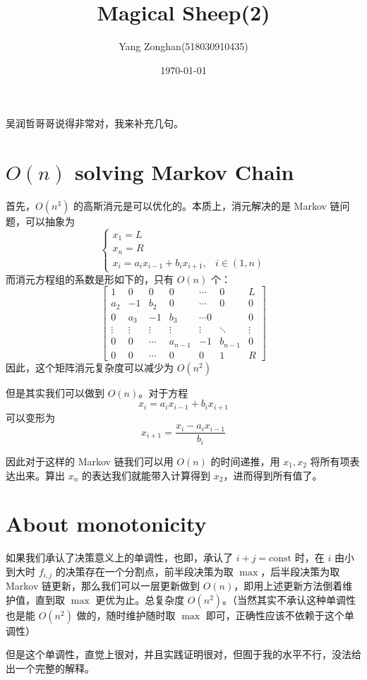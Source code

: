 \documentclass[11pt,a4paper,oneside]{article}
\begin{document}
\title{\textbf{Magical Sheep(2)}}
\author{Yang Zonghan(518030910435)}
\date{\today}
\setlength{\parindent}{2em}

吴润哲哥哥说得非常对，我来补充几句。

\section{$O(n)$ solving Markov Chain}
首先，$O(n ^ 3)$ 的高斯消元是可以优化的。本质上，消元解决的是 Markov 链问题，可以抽象为 $$
\begin{cases}
    x_1 = L \\
    x_n = R \\
    x_i = a_i x_{i- 1} + b_i x_{i + 1}, &i \in (1, n)
\end{cases}
$$ 而消元方程组的系数是形如下的，只有 $O(n)$ 个：
$$\begin{bmatrix}
     1 & 0 & 0 & 0 &\cdots & 0 & L\\
     a_2 & -1 & b_2 & 0 & \cdots & 0 & 0 \\
     0 & a_3 & -1 & b_3 &\cdots 0& & 0 \\
     \vdots & \vdots & \vdots  & \vdots  & \vdots & \ddots & \vdots \\
     0 & 0 & \cdots & a_{n - 1} & -1 & b_{n - 1} & 0\\
     0 & 0 & \cdots & 0 & 0 & 1 & R
\end{bmatrix}$$ 因此，这个矩阵消元复杂度可以减少为 $O(n ^ 2)$

但是其实我们可以做到 $O(n)$。对于方程 $$
x_i = a_i x_{i- 1} + b_i x_{i + 1}
$$ 可以变形为 $$
x_{i + 1} = \frac {x_i - a_i x_{i - 1}} {b_{i}}
$$

因此对于这样的 Markov 链我们可以用 $O(n)$ 的时间递推，用 $x_1, x_2$ 将所有项表达出来。算出 $x_n$ 的表达我们就能带入计算得到 $x_2$，进而得到所有值了。

\section{About monotonicity}

如果我们承认了决策意义上的单调性，也即，承认了 $i + j = \text{const}$ 时，在 $i$ 由小到大时 $f_{i, j}$ 的决策存在一个分割点，前半段决策为取 $\max$，后半段决策为取 Markov 链更新，那么我们可以一层更新做到 $O(n)$，即用上述更新方法倒着维护值，直到取 $\max$ 更优为止。总复杂度 $O(n ^ 2)$。（当然其实不承认这种单调性也是能 $O(n ^ 2)$ 做的，随时维护随时取 $\max$ 即可，正确性应该不依赖于这个单调性）

但是这个单调性，直觉上很对，并且实践证明很对，但囿于我的水平不行，没法给出一个完整的解释。
\end{document}
